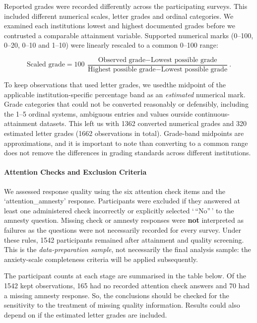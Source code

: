 \documentclass[
]{article}
\begin{document}
Reported grades were recorded differently across the participating
surveys. This included different numerical scales, letter grades and
ordinal categories. We examined each institutions lowest and highest
documented grades before we contrusted a comparable attainment variable.
Supported numerical marks (0--100, 0--20, 0--10 and 1--10) were linearly
rescaled to a common 0--100 range:

\[
\text{Scaled grade} = 100\,\frac{\text{Observed grade} - \text{Lowest possible grade}}{\text{Highest possible grade} - \text{Lowest possible grade}}.
\]

To keep observations that used letter grades, we usedthe midpoint of the
applicable institution-specific percentage band as an \emph{estimated}
numerical mark. Grade categories that could not be converted reasonably
or defensibly, including the 1--5 ordinal systems, ambiguous entries and
values ourside continuous-attainment datasets. This left us with 1362
converted numerical grades and 320 estimated letter grades (1662
observations in total). Grade-band midpoints are approximations, and it
is important to note than converting to a common range does not remove
the differences in grading standards across different institutions.

\paragraph{Attention Checks and Exclusion
Criteria}\label{attention-checks-and-exclusion-criteria}

We assessed response quality using the six attention check items and the
`attention\_amnesty' response. Participants were excluded if they
answered at least one administered check incorrectly or explicitly
selected `\,``No''\,' to the amnesty question. Missing check or amnesty
responses were \textbf{not} interpreted as failures as the questions
were not necessarily recorded for every survey. Under these rules, 1542
participants remained after attainment and quality screening. This is
the \emph{data-preparation sample}, not necessarily the final analysis
sample: the anxiety-scale completeness criteria will be applied
subsequently.

The participant counts at each stage are summarised in the table below.
Of the 1542 kept observations, 165 had no recorded attention check
answers and 70 had a missing amnesty response. So, the conclusions
should be checked for the sensitivity to the treatment of missing
quality information. Results could also depend on if the estimated
letter grades are included.
\end{document}
